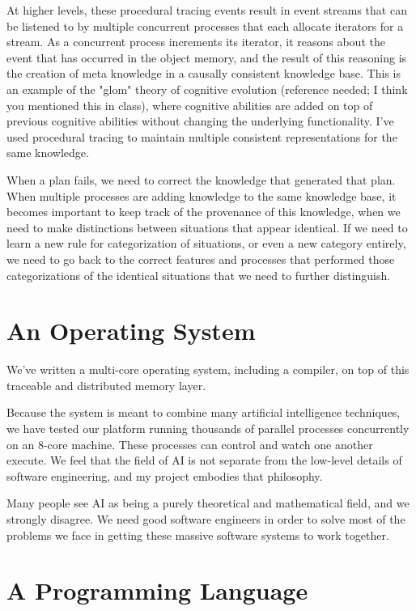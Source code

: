At higher levels, these procedural tracing events result in event
streams that can be listened to by multiple concurrent processes that
each allocate iterators for a stream.  As a concurrent process
increments its iterator, it reasons about the event that has occurred in
the object memory, and the result of this reasoning is the creation of
meta knowledge in a causally consistent knowledge base.  This is an
example of the "glom" theory of cognitive evolution (reference needed; I
think you mentioned this in class), where cognitive abilities are added
on top of previous cognitive abilities without changing the underlying
functionality.  I've used procedural tracing to maintain multiple
consistent representations for the same knowledge.

When a plan fails, we need to correct the knowledge that generated that
plan.  When multiple processes are adding knowledge to the same
knowledge base, it becomes important to keep track of the provenance of
this knowledge, when we need to make distinctions between situations
that appear identical.  If we need to learn a new rule for
categorization of situations, or even a new category entirely, we need
to go back to the correct features and processes that performed those
categorizations of the identical situations that we need to further
distinguish.



\section{An Operating System}

We've written a multi-core operating system, including a
compiler, on top of this traceable and distributed memory layer.

Because the system is meant to combine many artificial intelligence
techniques, we have tested our platform running thousands of parallel
processes concurrently on an 8-core machine.  These processes can
control and watch one another execute.  We feel that the field of AI
is not separate from the low-level details of software engineering,
and my project embodies that philosophy.

Many people see AI as being a purely theoretical and mathematical
field, and we strongly disagree.  We need good software engineers in
order to solve most of the problems we face in getting these massive
software systems to work together.

\section{A Programming Language}

